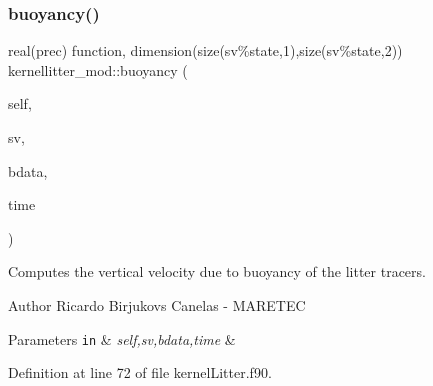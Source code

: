 \subsubsection{\texorpdfstring{buoyancy()}{buoyancy()}}
{\footnotesize\ttfamily real(prec) function, dimension(size(sv\%state,1),size(sv\%state,2)) kernellitter\+\_\+mod\+::buoyancy (\begin{DoxyParamCaption}\item[{class(\mbox{\hyperlink{structkernellitter__mod_1_1kernellitter__class}{kernellitter\+\_\+class}}), intent(inout)}]{self,  }\item[{type(statevector\+\_\+class), intent(in)}]{sv,  }\item[{type(\mbox{\hyperlink{structbackground__mod_1_1background__class}{background\+\_\+class}}), dimension(\+:), intent(in)}]{bdata,  }\item[{real(prec), intent(in)}]{time }\end{DoxyParamCaption})}



Computes the vertical velocity due to buoyancy of the litter tracers. 

\begin{DoxyAuthor}{Author}
Ricardo Birjukovs Canelas -\/ M\+A\+R\+E\+T\+EC 
\end{DoxyAuthor}

\begin{DoxyParams}[1]{Parameters}
\mbox{\tt in}  & {\em self,sv,bdata,time} & \\
\hline
\end{DoxyParams}


Definition at line 72 of file kernel\+Litter.\+f90.


